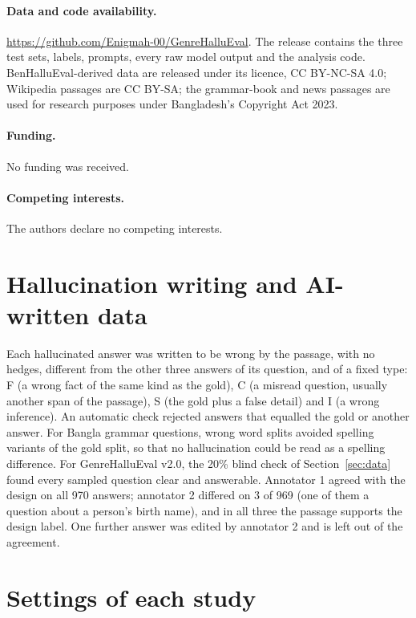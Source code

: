 \documentclass[11pt]{article}
\begin{document}
\paragraph{Data and code availability.} \url{https://github.com/Enigmah-00/GenreHalluEval}. The release contains the
three test sets, labels, prompts, every raw model output and the analysis code. BenHalluEval-derived data are
released under its licence, CC BY-NC-SA 4.0; Wikipedia passages are CC BY-SA; the grammar-book and news passages
are used for research purposes under Bangladesh's Copyright Act 2023.

\paragraph{Funding.} No funding was received.

\paragraph{Competing interests.} The authors declare no competing interests.




\appendix
\section{Hallucination writing and AI-written data}\label{app:ai}

Each hallucinated answer was written to be wrong by the passage, with no hedges, different from the other three
answers of its question, and of a fixed type: F (a wrong fact of the same kind as the gold), C (a misread question,
usually another span of the passage), S (the gold plus a false detail) and I (a wrong inference). An automatic check
rejected answers that equalled the gold or another answer. For Bangla grammar questions, wrong word splits avoided
spelling variants of the gold split, so that no hallucination could be read as a spelling difference. For GenreHalluEval
v2.0, the 20\% blind check of Section~\ref{sec:data} found every sampled question clear and answerable. Annotator 1
agreed with the design on all 970 answers; annotator 2 differed on 3 of 969 (one of them a question about a person's
birth name), and in all three the passage supports the design label. One further answer was edited by annotator 2
and is left out of the agreement.

\section{Settings of each study}\label{app:settings}
\end{document}
